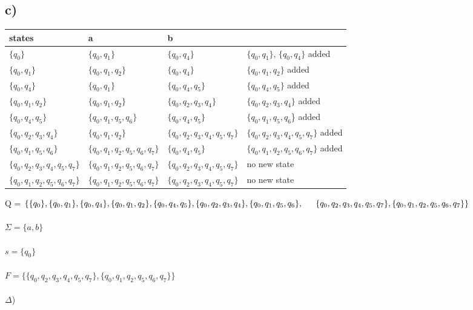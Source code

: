 \documentclass[12pt]{article}
\begin{document}
\subsection*{c)}
\begin{tabular}{ l l l l}
  \hline
  states & a & b \\ 
  \hline
  $\{q_0\}$ & $\{q_0,q_1\}$ & $\{q_0,q_4\}$ & $\{q_0,q_1\}$, $\{q_0,q_4\}$ added\\
  $\{q_0,q_1\}$ & $\{q_0,q_1,q_2\}$ & $\{q_0,q_4\}$ & $\{q_0,q_1,q_2\}$ added\\
  $\{q_0,q_4\}$ & $\{q_0,q_1\}$ & $\{q_0,q_4,q_5\}$ & $\{q_0,q_4,q_5\}$ added\\
  $\{q_0,q_1,q_2\}$ & $\{q_0,q_1,q_2\}$ & $\{q_0,q_2,q_3,q_4\}$ & $\{q_0,q_2,q_3,q_4\}$ added\\
  $\{q_0,q_4,q_5\}$ & $\{q_0,q_1,q_5,q_6\}$ & $\{q_0,q_4,q_5\}$ & $\{q_0,q_1,q_5,q_6$\} added\\
  $\{q_0,q_2,q_3,q_4\}$ & $\{q_0,q_1,q_2\}$ & $\{q_0,q_2,q_3,q_4,q_5,q_7\}$ & $\{q_0,q_2,q_3,q_4,q_5,q_7\}$ added\\
  $\{q_0,q_1,q_5,q_6\}$ & $\{q_0,q_1,q_2,q_5,q_6,q_7\}$ & $\{q_0,q_4,q_5\}$ & $\{q_0,q_1,q_2,q_5,q_6,q_7\}$ added\\
  $\{q_0,q_2,q_3,q_4,q_5,q_7\}$ & $\{q_0,q_1,q_2,q_5,q_6,q_7\}$ & $\{q_0,q_2,q_3,q_4,q_5,q_7\}$ & no new state\\
  $\{q_0,q_1,q_2,q_5,q_6,q_7\}$ & $\{q_0,q_1,q_2,q_5,q_6,q_7\}$ & $\{q_0,q_2,q_3,q_4,q_5,q_7\}$ & no new state\\

  \hline
\end{tabular}
\newpage
\noindent
Q = $\{\{q_0\},
\{q_0,q_1\},
\{q_0,q_4\},
\{q_0,q_1,q_2\},
\{q_0,q_4,q_5\},
\{q_0,q_2,q_3,q_4\},
\{q_0,q_1,q_5,q_6\},\\
\indent
\{q_0,q_2,q_3,q_4,q_5,q_7\},
\{q_0,q_1,q_2,q_5,q_6,q_7\}\}$\\\\
$\Sigma = \{a, b\}$\\\\
$s = \{q_0\}$\\\\
$F = \{\{q_0,q_2,q_3,q_4,q_5,q_7\},
\{q_0,q_1,q_2,q_5,q_6,q_7\}\}$\\\\
$\Delta$)
\end{document}
